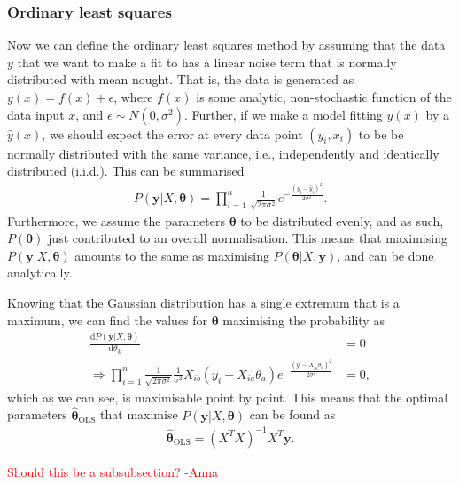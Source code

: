 \documentclass[twocolumn,english,notitlepage]{article}
\newcommand{\comment}[1]{\textcolor{red}{#1}\\}
\renewcommand{\d}[2][x]{\ensuremath{\frac{\mathrm{d}#2}{\mathrm{d}#1}}}
\renewcommand{\vec}[1]{\boldsymbol{#1}}
\newcommand{\pclosed}[1]{\left(#1\right)}
\renewcommand{\exp}[1]{e^{#1}}
\newcommand{\msub}[2]{\ensuremath{{#1}_\text{#2}}}
\begin{document}
        \subsubsection{Ordinary least squares}
            Now we can define the ordinary least squares method by assuming that the data $y$ that we want to make a fit to has a linear noise term that is normally distributed with mean nought. That is, the data is generated as $y(x) = f(x) + \epsilon$, where $f(x)$ is some analytic, non-stochastic function of the data input $x$, and $\epsilon \sim N(0, \sigma^2)$. Further, if we make a model fitting $y(x)$ by a $\hat{y}(x)$, we should expect the error at every data point $(y_i, x_i)$ to be be normally distributed with the same variance, i.e., independently and identically distributed (i.i.d.). This can be summarised
            \begin{align}
                P(\vec{y}|X, \vec{\theta}) = \prod_{i=1}^{n} \frac{1}{\sqrt{2\pi\sigma^2}} \exp{-\frac{{(y_i-\hat{y}_i)}^2}{2\sigma^2}}.
            \end{align}
            Furthermore, we assume the parameters $\vec{\theta}$ to be distributed evenly, and as such, $P(\vec{\theta})$ just contributed to an overall normalisation. This means that maximising $P(\vec{y}|X, \vec{\theta})$ amounts to the same as maximising $P(\vec{\theta}|X, \vec{y})$, and can be done analytically.

            Knowing that the Gaussian distribution has a single extremum that is a maximum, we can find the values for $\vec{\theta}$ maximising the probability as
            \begin{align} \nonumber
                \d[\theta_k]{P(\vec{y}|X,\vec{\theta})} &= 0 \\
                \Rightarrow \prod_{i=1}^{n} \frac{1}{\sqrt{2\pi\sigma^2}} \frac{1}{\sigma^2} X_{ib}(y_i-X_{ia}\theta_a) \exp{-\frac{{(y_i - X_{ia}\theta_a)}^2}{2\sigma^2}} &= 0,
            \end{align}
            which as we can see, is maximisable point by point. This means that the optimal parameters $\msub{\vec{\hat{\theta}}}{OLS}$ that maximise $P(\vec{y}|X, \vec{\theta})$ can be found as
            \begin{align}
                \boxed{
                \msub{\vec{\hat{\theta}}}{OLS} = \pclosed{X^TX}^{-1} X^T \vec{y}.
                }
            \end{align}

        \comment{Should this be a subsubsection? -Anna}
\end{document}
